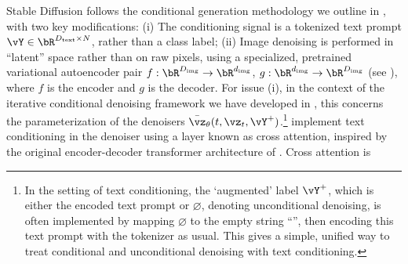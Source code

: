 \documentclass[../../book-main.tex]{subfiles}
\begin{document}
Stable Diffusion follows the conditional generation methodology we outline in
, with two key modifications: (i) The conditioning signal is a
tokenized text prompt $\vY \in
\bR^{D_{\mathrm{text}} \times N}$, rather than a class label; (ii)
Image denoising is
performed in ``latent'' space rather than on raw pixels, using a specialized,
pretrained variational autoencoder pair $f : \bR^{D_{\mathrm{img}}} \to
\bR^{d_{\mathrm{img}}}$, $g : \bR^{d_{\mathrm{img}}} \to
\bR^{D_{\mathrm{img}}}$ (see ), where $f$
is the encoder and $g$ is the decoder.
For issue (i), in the context of the iterative conditional denoising
framework we have
developed in , this concerns the parameterization of the denoisers
$\bar{\vz}_{\theta}(t, \vz_t, \vY^+)$.\footnote{In the setting of text
    conditioning, the `augmented' label $\vY^+$, which is either the
    encoded text
    prompt or $\varnothing$, denoting unconditional denoising, is
    often implemented
    by mapping $\varnothing$ to the empty string ``'', then encoding this text
    prompt with the tokenizer as usual. This gives a simple, unified
    way to treat
conditional and unconditional denoising with text conditioning.}
\textcite{rombach2022high} implement text conditioning in the denoiser using
a layer known as cross attention, inspired by the original encoder-decoder
transformer architecture of \textcite{vaswani2017attention}. Cross attention is
\end{document}

